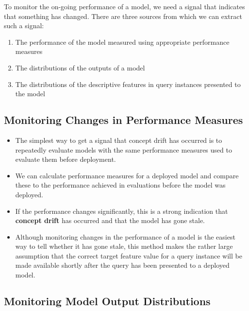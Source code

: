 \documentclass[xcolor={table}]{beamer}
\newcommand{\keyword}[1]{\alert{\textbf{#1}}\index{#1}}
\begin{document}
\begin{frame}
\noindent To monitor the on-going performance of a model, we need a signal that indicates that something has changed. There are three sources from which we can extract such a signal:
\begin{enumerate}
	\item The performance of the model measured using appropriate performance measures
	\item The distributions of the outputs of a model
	\item The distributions of the descriptive features in query instances presented to the model
\end{enumerate}
\end{frame}

\subsection{Monitoring Changes in Performance Measures}

\begin{frame}
\begin{itemize}
	\item The simplest way to get a signal that concept drift has occurred is to repeatedly evaluate models with the same performance measures used to evaluate them before deployment. 
	\item We can calculate performance measures for a deployed model and compare these to the performance achieved in evaluations before the model was deployed. 
	\item If the performance changes significantly, this is a strong indication that \keyword{concept drift} has occurred and that the model has gone stale.
\end{itemize}
\end{frame}

\begin{frame}
	\begin{itemize}
		\item Although monitoring changes in the performance of a model is the easiest way to tell whether it has gone stale, this method makes the rather large assumption that the correct target feature value for a query instance will be made available shortly after the query has been presented to a deployed model.
	\end{itemize}
\end{frame}

\subsection{Monitoring Model Output Distributions}
\end{document}

